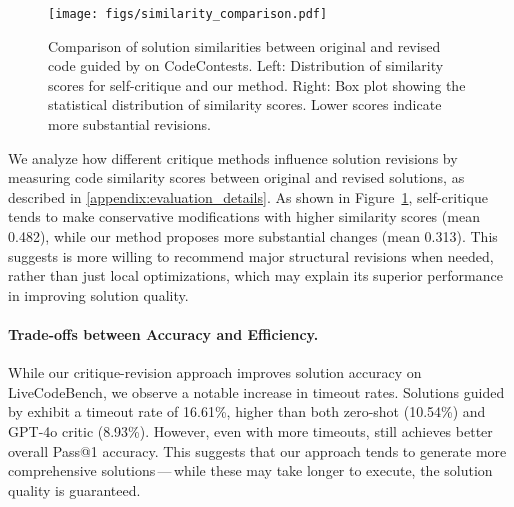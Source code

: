 \begin{figure}[t!]
    \centering
    \texttt{[image: figs/similarity\_comparison.pdf]}
    \vspace{-5mm}
    \caption{Comparison of solution similarities between original and revised code guided by {\ours} on CodeContests. Left: Distribution of similarity scores for self-critique and our {\ours} method. Right: Box plot showing the statistical distribution of similarity scores. Lower scores indicate more substantial revisions.}
    \label{fig:similarity}
\end{figure}

We analyze how different critique methods influence solution revisions by measuring code similarity scores between original and revised solutions, as described in \cref{appendix:evaluation_details}. As shown in Figure~\ref{fig:similarity}, self-critique tends to make conservative modifications with higher similarity scores (mean 0.482), while our {\ours} method proposes more substantial changes (mean 0.313). This suggests {\ours} is more willing to recommend major structural revisions when needed, rather than just local optimizations, which may explain its superior performance in improving solution quality.

\paragraph{{\ours} Trade-offs between Accuracy and Efficiency.}
While our critique-revision approach improves solution accuracy on LiveCodeBench, we observe a notable increase in timeout rates. Solutions guided by {\ours} exhibit a timeout rate of 16.61\%, higher than both zero-shot (10.54\%) and GPT-4o critic (8.93\%). However, even with more timeouts, {\ours} still achieves better overall Pass@1 accuracy. This suggests that our approach tends to generate more comprehensive solutions\,---\,while these may take longer to execute, the solution quality is guaranteed.













